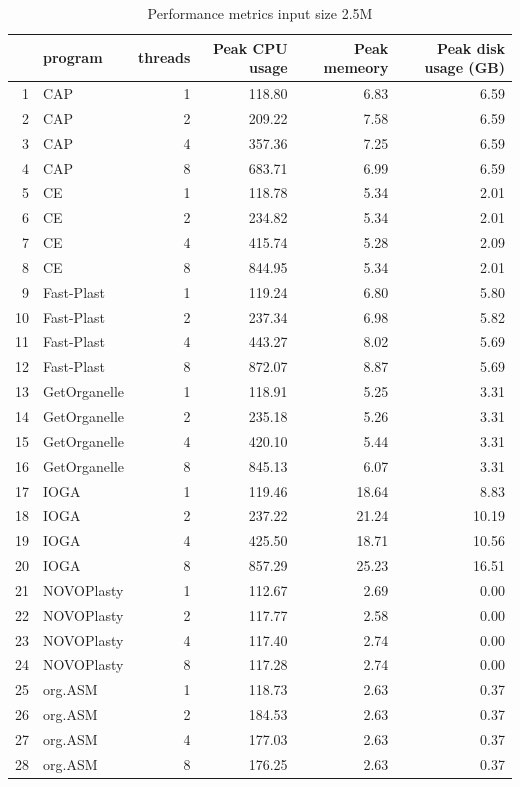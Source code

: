 \documentclass{bmcart}
\begin{document}
\begin{backmatter}
\begin{table}[ht]
\caption{Performance metrics input size 2.5M}
\label{tab:perform2.5M  }
\centering
\begin{tabular}{rlrrrr}
  \hline
 & program & threads & Peak CPU usage & Peak memeory & Peak disk usage (GB) \\ 
 \hline
1 & CAP &   1 & 118.80 & 6.83 & 6.59 \\ 
  2 & CAP &   2 & 209.22 & 7.58 & 6.59 \\ 
  3 & CAP &   4 & 357.36 & 7.25 & 6.59 \\ 
  4 & CAP &   8 & 683.71 & 6.99 & 6.59 \\ 
  5 & CE &   1 & 118.78 & 5.34 & 2.01 \\ 
  6 & CE &   2 & 234.82 & 5.34 & 2.01 \\ 
  7 & CE &   4 & 415.74 & 5.28 & 2.09 \\ 
  8 & CE &   8 & 844.95 & 5.34 & 2.01 \\ 
  9 & Fast-Plast &   1 & 119.24 & 6.80 & 5.80 \\ 
  10 & Fast-Plast &   2 & 237.34 & 6.98 & 5.82 \\ 
  11 & Fast-Plast &   4 & 443.27 & 8.02 & 5.69 \\ 
  12 & Fast-Plast &   8 & 872.07 & 8.87 & 5.69 \\ 
  13 & GetOrganelle &   1 & 118.91 & 5.25 & 3.31 \\ 
  14 & GetOrganelle &   2 & 235.18 & 5.26 & 3.31 \\ 
  15 & GetOrganelle &   4 & 420.10 & 5.44 & 3.31 \\ 
  16 & GetOrganelle &   8 & 845.13 & 6.07 & 3.31 \\ 
  17 & IOGA &   1 & 119.46 & 18.64 & 8.83 \\ 
  18 & IOGA &   2 & 237.22 & 21.24 & 10.19 \\ 
  19 & IOGA &   4 & 425.50 & 18.71 & 10.56 \\ 
  20 & IOGA &   8 & 857.29 & 25.23 & 16.51 \\ 
  21 & NOVOPlasty &   1 & 112.67 & 2.69 & 0.00 \\ 
  22 & NOVOPlasty &   2 & 117.77 & 2.58 & 0.00 \\ 
  23 & NOVOPlasty &   4 & 117.40 & 2.74 & 0.00 \\ 
  24 & NOVOPlasty &   8 & 117.28 & 2.74 & 0.00 \\ 
  25 & org.ASM &   1 & 118.73 & 2.63 & 0.37 \\ 
  26 & org.ASM &   2 & 184.53 & 2.63 & 0.37 \\ 
  27 & org.ASM &   4 & 177.03 & 2.63 & 0.37 \\ 
  28 & org.ASM &   8 & 176.25 & 2.63 & 0.37 \\ 
   \hline
\end{tabular}
\end{table}



\end{backmatter}
\end{document}
